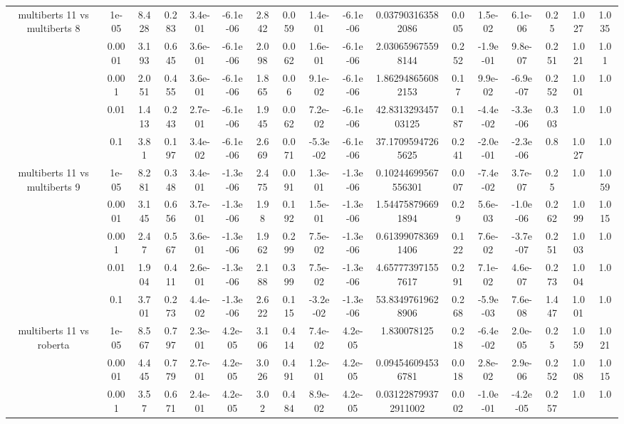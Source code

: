 \begin{tabular}{|c|c|c|c|c|c|c|c|c|c|c|c|c|c|c|c|c|}
\hline
\multirow{5}{*}{multiberts 11 vs multiberts 8} & 1e-05 & 8.428 & 0.283 & 3.4e-01 & -6.1e-06 & 2.842 & 0.059 & 1.4e-01 & -6.1e-06 & 0.037903163582086 & 0.005 & 1.5e-02 & 6.1e-06 & 0.25 & 1.027 & 1.035 \\
 & 0.0001 & 3.193 & 0.645 & 3.6e-01 & -6.1e-06 & 2.098 & 0.062 & 1.6e-01 & -6.1e-06 & 2.030659675598144 & 0.252 & -1.9e-01 & 9.8e-07 & 0.251 & 1.021 & 1.01 \\
 & 0.001 & 2.051 & 0.455 & 3.6e-01 & -6.1e-06 & 1.865 & 0.06 & 9.1e-02 & -6.1e-06 & 1.862948656082153 & 0.17 & 9.9e-02 & -6.9e-07 & 0.252 & 1.001 & 1.0 \\
 & 0.01 & 1.413 & 0.243 & 2.7e-01 & -6.1e-06 & 1.945 & 0.062 & 7.2e-02 & -6.1e-06 & 42.831329345703125 & 0.187 & -4.4e-02 & -3.3e-06 & 0.303 & 1.0 & 1.0 \\
 & 0.1 & 3.81 & 0.197 & 3.4e-02 & -6.1e-06 & 2.669 & 0.071 & -5.3e-02 & -6.1e-06 & 37.17095947265625 & 0.241 & -2.0e-01 & -2.3e-06 & 0.8 & 1.027 & 1.0 \\
\hline
\multirow{5}{*}{multiberts 11 vs multiberts 9} & 1e-05 & 8.281 & 0.348 & 3.4e-01 & -1.3e-06 & 2.475 & 0.091 & 1.3e-01 & -1.3e-06 & 0.10244699567556301 & 0.007 & -7.4e-02 & 3.7e-07 & 0.25 & 1.0 & 1.059 \\
 & 0.0001 & 3.145 & 0.656 & 3.7e-01 & -1.3e-06 & 1.98 & 0.192 & 1.5e-01 & -1.3e-06 & 1.544758796691894 & 0.29 & 5.6e-03 & -1.0e-06 & 0.262 & 1.099 & 1.015 \\
 & 0.001 & 2.47 & 0.567 & 3.6e-01 & -1.3e-06 & 1.962 & 0.299 & 7.5e-02 & -1.3e-06 & 0.613990783691406 & 0.122 & 7.6e-02 & -3.7e-07 & 0.251 & 1.003 & 1.0 \\
 & 0.01 & 1.904 & 0.411 & 2.6e-01 & -1.3e-06 & 2.188 & 0.399 & 7.5e-02 & -1.3e-06 & 4.657773971557617 & 0.291 & 7.1e-02 & 4.6e-07 & 0.273 & 1.004 & 1.0 \\
 & 0.1 & 3.701 & 0.273 & 4.4e-02 & -1.3e-06 & 2.622 & 0.115 & -3.2e-02 & -1.3e-06 & 53.83497619628906 & 0.268 & -5.9e-03 & 7.6e-08 & 1.447 & 1.001 & 1.0 \\
\hline
\multirow{5}{*}{multiberts 11 vs roberta } & 1e-05 & 8.567 & 0.797 & 2.3e-01 & 4.2e-05 & 3.106 & 0.414 & 7.4e-02 & 4.2e-05 & 1.830078125 & 0.218 & -6.4e-02 & 2.0e-05 & 0.25 & 1.059 & 1.021 \\
 & 0.0001 & 4.445 & 0.779 & 2.7e-01 & 4.2e-05 & 3.026 & 0.491 & 1.2e-01 & 4.2e-05 & 0.094546094536781 & 0.018 & 2.8e-02 & 2.9e-06 & 0.252 & 1.008 & 1.015 \\
 & 0.001 & 3.57 & 0.671 & 2.4e-01 & 4.2e-05 & 3.02 & 0.484 & 8.9e-02 & 4.2e-05 & 0.031228799372911002 & 0.002 & -1.0e-01 & -4.2e-05 & 0.257 & 1.0 & 1.0 \\

\end{tabular}
